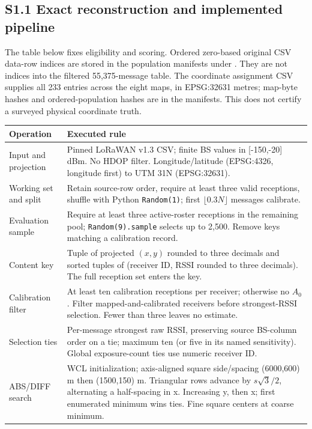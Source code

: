 \documentclass[journal,onecolumn,10pt]{IEEEtran}
\begin{document}
\subsection*{S1.1 Exact reconstruction and implemented pipeline}
The table below fixes eligibility and scoring. Ordered zero-based original CSV data-row indices are stored in the population manifests under . They are not indices into the filtered 55,375-message table. The coordinate assignment CSV supplies all 233 entries across the eight maps, in EPSG:32631 metres; map-byte hashes and ordered-population hashes are in the manifests. This does not certify a surveyed physical coordinate truth.
\begin{center}\begin{minipage}{\textwidth}\centering\small
{}\label{tab:s-exact-methods}
\begin{tabular}{@{}p{}p{}@{}}
\toprule
Operation & Executed rule \\
\midrule
Input and projection & Pinned LoRaWAN v1.3 CSV; finite BS values in [-150,-20] dBm. No HDOP filter. Longitude/latitude (EPSG:4326, longitude first) to UTM 31N (EPSG:32631). \\
Working set and split & Retain source-row order, require at least three valid receptions, shuffle with Python \texttt{Random(1)}; first $\lfloor0.3N\rfloor$ messages calibrate. \\
Evaluation sample & Require at least three active-roster receptions in the remaining pool; \texttt{Random(9).sample} selects up to 2,500. Remove keys matching a calibration record. \\
Content key & Tuple of projected $(x,y)$ rounded to three decimals and sorted tuples of (receiver ID, RSSI rounded to three decimals). The full reception set enters the key. \\
Calibration filter & At least ten calibration receptions per receiver; otherwise no $A_0$. Filter mapped-and-calibrated receivers before strongest-RSSI selection. Fewer than three leaves no estimate. \\
Selection ties & Per-message strongest raw RSSI, preserving source BS-column order on a tie; maximum ten (or five in its named sensitivity). Global exposure-count ties use numeric receiver ID. \\
ABS/DIFF search & WCL initialization; axis-aligned square side/spacing (6000,600) m then (1500,150) m. Triangular rows advance by $s\sqrt{3}/2$, alternating a half-spacing in x. Increasing y, then x; first enumerated minimum wins ties. Fine square centers at coarse minimum. \\

\end{tabular}
\end{minipage}
\end{center}
\end{document}
